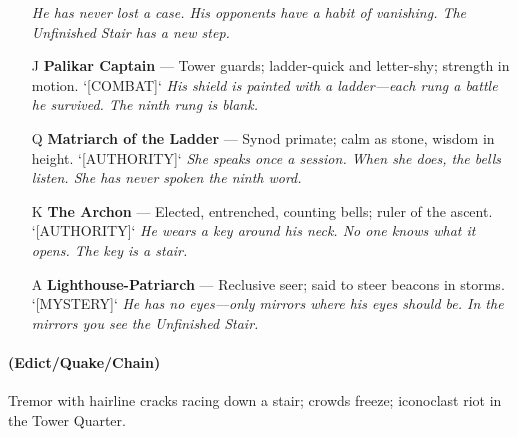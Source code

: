 \begin{enumerate}
  \hfill \textit{He has never lost a case. His opponents have a habit of vanishing. The Unfinished Stair has a new step.}
\item[J] \textbf{Palikar Captain} --- Tower guards; ladder-quick and letter-shy; strength in motion. `[COMBAT]`
  \hfill \textit{His shield is painted with a ladder---each rung a battle he survived. The ninth rung is blank.}
\item[Q] \textbf{Matriarch of the Ladder} --- Synod primate; calm as stone, wisdom in height. `[AUTHORITY]`
  \hfill \textit{She speaks once a session. When she does, the bells listen. She has never spoken the ninth word.}
\item[K] \textbf{The Archon} --- Elected, entrenched, counting bells; ruler of the ascent. `[AUTHORITY]`
  \hfill \textit{He wears a key around his neck. No one knows what it opens. The key is a stair.}
\item[A] \textbf{Lighthouse-Patriarch} --- Reclusive seer; said to steer beacons in storms. `[MYSTERY]`
  \hfill \textit{He has no eyes---only mirrors where his eyes should be. In the mirrors you see the Unfinished Stair.}
\end{enumerate}

\paragraph*{(Edict/Quake/Chain)} Tremor with hairline cracks racing down a stair; crowds freeze; iconoclast riot in the Tower Quarter.

